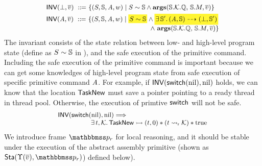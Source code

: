 \[
    \small
    \begin{array}{l}
        \INV{(\primdone, \args{\val})} \ \define \ 
        \{
        (\state, \hpstate, \primcom, \word) \sepline
        \stateRel{\state}{\hpstate}
        \land 
        \arguments(\hpstate.\hthrdlocalst.\hRstate, \,  
        \hpstate.\Mem, \args{\val})
        \} \\
        \\[-8pt]
        \INV{(\primcom, \args{\val})} \ \define \ 
        \{
            (\state, \hpstate, \primcom, \word) \sepline
            \colorbox{yellow!80}{\!$\stateRel{\state}{\hpstate}$\!}
            \land 
            \colorbox{yellow!80}
            {\!\!\!
                $\exists \, \hpstate'. \,
                \primTrans{(\primcom, 
                    \hpstate)}{(\primdone, \hpstate')}$ 
            \!\!\!} \\
            \hspace*{15.8em} 
            \land \
            \arguments(\hpstate.\hthrdlocalst.\hRstate, \,  
            \hpstate.\Mem, \args{\val})
        \}
    \end{array}
\]
The invariant consists of the state relation between low- and 
high-level program state 
(define as ${S} \sim {\mathbb{S}}$ in 
\Fig{\ref{fig:State Relation between Low- and High-level Program State}}), 
and the safe execution of the primitive command. 
Including the safe execution of the primitive command is 
important 
because we can get some knowledges of high-level program 
state from safe execution of specific primitive command $\textit{A}$. 
For example, if $\textsf{INV}{(\mathsf{switch}(\text{nil}), \text{nil})}$
holds, we can know that the location $\mathsf{TaskNew}$ 
must save a pointer pointing to a ready thread
in thread pool.
Otherwise, 
the execution of primtive $\mathsf{switch}$ will not be safe.
\[
    \small
    \begin{array}{l}
        \textsf{INV}{(\mathsf{switch}(\text{nil}), \text{nil})} 
        \Longrightarrow \\ 
        \hspace*{5em}
        \exists \, t, \mathcal{K}. \, 
        {\mathsf{TaskNew}} \rightarrowtail {(t, 0)} 
        * 
        ({t} \leadsto_{\textsf{r}} {\mathcal{K}})
        * \text{true}
    \end{array}
\]
We introduce frame $\relastP_r$ for local reasoning, 
and it should be stable under the execution 
of the abstract assembly primitive
(shown as $\Sta(\hprim(\args{\val}), \relastP_r)$)
defined below). 

